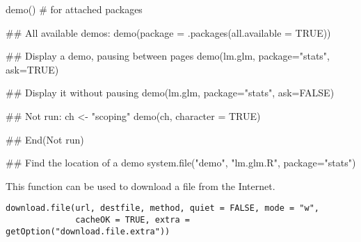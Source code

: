 \begin{Examples}
\begin{ExampleCode}
demo() # for attached packages

## All available demos:
demo(package = .packages(all.available = TRUE))


## Display a demo, pausing between pages
demo(lm.glm, package="stats", ask=TRUE)

## Display it without pausing
demo(lm.glm, package="stats", ask=FALSE)


## Not run: 
 ch <- "scoping"
 demo(ch, character = TRUE)

## End(Not run)

## Find the location of a demo
system.file("demo", "lm.glm.R", package="stats")
\end{ExampleCode}
\end{Examples}
%
\begin{Description}\relax
This function can be used to download a file from the Internet.
\end{Description}
%
\begin{Usage}
\begin{verbatim}
download.file(url, destfile, method, quiet = FALSE, mode = "w",
              cacheOK = TRUE, extra = getOption("download.file.extra"))
\end{verbatim}
\end{Usage}
%
